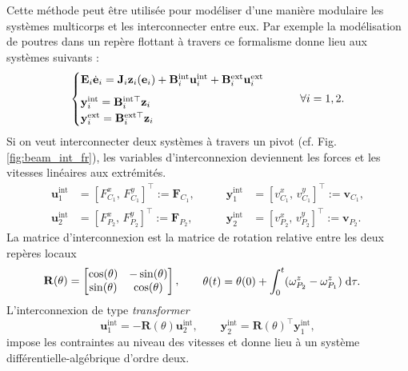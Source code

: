 Cette méthode peut être utilisée pour modéliser d'une manière modulaire les systèmes multicorps et les interconnecter entre eux. Par exemple la modélisation de poutres dans un repère flottant  à travers ce formalisme donne lieu aux systèmes suivants :
\begin{equation*}
\begin{cases}
\mathbf{E}_i \dot{\mathbf{e}}_i = \mathbf{J}_i \mathbf{z}_i(\mathbf{e}_i) + \mathbf{B}_i^{\text{int}} \mathbf{u}_i^{\text{int}} + \mathbf{B}_i^{\text{ext}} \mathbf{u}_i^{\text{ext}}  \vspace{2mm} \\
\mathbf{y}_i^{\text{int}} = \mathbf{B}_i^{\text{int} \top}  \mathbf{z}_i \\
\mathbf{y}_i^{\text{ext}} = \mathbf{B}_i^{\text{ext} \top}  \mathbf{z}_i \\
\end{cases} \qquad \forall i = 1, 2.
\end{equation*}
Si on veut interconnecter deux systèmes à travers un pivot (cf. Fig. \ref{fig:beam_int_fr}), les variables d'interconnexion deviennent les forces et les vitesses linéaires  aux extrémités.
\begin{equation*}
\begin{aligned}
\mathbf{u}_1^{\text{int}} &= [F^x_{C_1}, \, F^y_{C_1}]^\top := \mathbf{F}_{C_1}, \\
\mathbf{u}_2^{\text{int}} &= [F^x_{P_2}, \, F^y_{P_2}]^\top := \mathbf{F}_{P_2},
\end{aligned} \qquad
\begin{aligned}
\mathbf{y}_1^{\text{int}} &= [v^x_{C_1}, \, v^y_{C_1}]^\top := \mathbf{v}_{C_1}, \\
\mathbf{y}_2^{\text{int}} &= [v^x_{P_2}, \, v^y_{P_2}]^\top := \mathbf{v}_{P_2}.
\end{aligned}
\end{equation*}
La matrice d'interconnexion est la matrice de rotation relative entre les deux repères locaux
\begin{equation*}
\mathbf{R}(\theta) = \begin{bmatrix}
\cos(\theta) & - \sin(\theta) \\
\sin(\theta) & \cos(\theta) \\
\end{bmatrix}, \qquad 
\begin{aligned}
\theta(t) &= \theta(0) + \int_{0}^t (\omega^z_{P_2} - \omega^z_{P_1}) \d{\tau}.
\end{aligned}
\end{equation*}
L'interconnexion de type \textit{transformer}
\begin{equation*}
\mathbf{u}_1^{\text{int}} = -\mathbf{R}(\theta) \mathbf{u}_2^{\text{int}}, \qquad
\mathbf{y}_2^{\text{int}} = \mathbf{R}(\theta)^\top \mathbf{y}_1^{\text{int}},
\end{equation*}
impose les contraintes au niveau des vitesses et donne lieu à un système différentielle-algébrique d'ordre deux.

